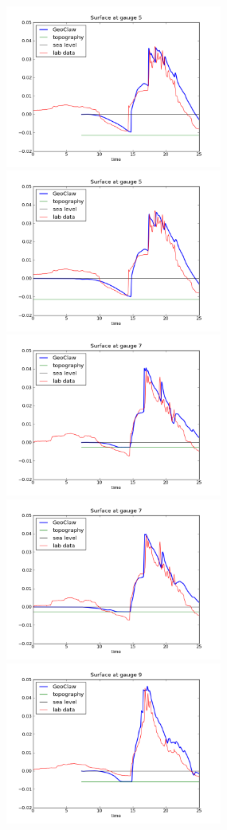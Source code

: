 \begin{figure}[ht]
\hfil\includegraphics[width=2.8in]{bp7/figs423/gauge0005fig300.png}\hfil
\hfil\includegraphics[width=2.8in]{bp7/figs211/gauge0005fig300.png}\hfil
\vskip 5pt
\hfil\includegraphics[width=2.8in]{bp7/figs423/gauge0007fig300.png}\hfil
\hfil\includegraphics[width=2.8in]{bp7/figs211/gauge0007fig300.png}\hfil
\vskip 5pt
\hfil\includegraphics[width=2.8in]{bp7/figs423/gauge0009fig300.png}\hfil

\end{figure}
